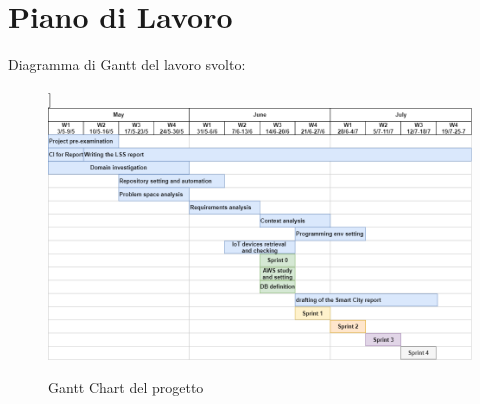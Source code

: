 

\chapter{Piano di Lavoro}

Diagramma di Gantt del lavoro svolto:
\begin{figure}[H]
    \caption{Gantt Chart del progetto}
    \label{fig:Gantt}] 
    \centering
   \includegraphics[width=1\textwidth]{DrawIo/GanttChart.png}
\end{figure}

